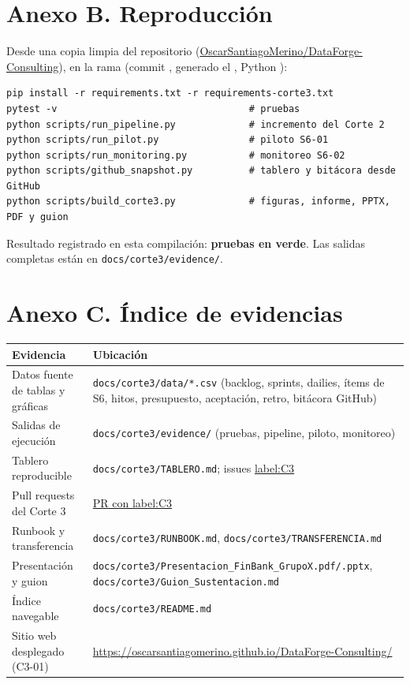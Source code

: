 \documentclass[10pt,a4paper]{article}
\newcommand{\repo}{\href{https://github.com/OscarSantiagoMerino/DataForge-Consulting}{OscarSantiagoMerino/DataForge-Consulting}}
\begin{document}
\section*{Anexo B. Reproducción}
Desde una copia limpia del repositorio (\repo), en la rama \texttt{\Rama} (commit \texttt{\SHA}, generado el \Generado, Python \PyVer):
\begin{verbatim}
pip install -r requirements.txt -r requirements-corte3.txt
pytest -v                                  # pruebas
python scripts/run_pipeline.py             # incremento del Corte 2
python scripts/run_pilot.py                # piloto S6-01
python scripts/run_monitoring.py           # monitoreo S6-02
python scripts/github_snapshot.py          # tablero y bitácora desde GitHub
python scripts/build_corte3.py             # figuras, informe, PPTX, PDF y guion
\end{verbatim}
Resultado registrado en esta compilación: \textbf{\Tests{} pruebas en verde}. Las salidas completas están en \texttt{docs/corte3/evidence/}.

\begin{table}[h]
\caption{Detalle del monitoreo semanal (\texttt{monitoring\_report.csv})}

\end{table}

\section*{Anexo C. Índice de evidencias}
\small
\begin{tabularx}{\linewidth}{l X}
\toprule
\textbf{Evidencia} & \textbf{Ubicación} \\
\midrule
Datos fuente de tablas y gráficas & \texttt{docs/corte3/data/*.csv} (backlog, sprints, dailies, ítems de S6, hitos, presupuesto, aceptación, retro, bitácora GitHub) \\
Salidas de ejecución & \texttt{docs/corte3/evidence/} (pruebas, pipeline, piloto, monitoreo) \\
Tablero reproducible & \texttt{docs/corte3/TABLERO.md}; issues \href{https://github.com/OscarSantiagoMerino/DataForge-Consulting/issues?q=label\%3AC3}{label:C3} \\
Pull requests del Corte 3 & \href{https://github.com/OscarSantiagoMerino/DataForge-Consulting/pulls?q=label\%3AC3}{PR con label:C3} \\
Runbook y transferencia & \texttt{docs/corte3/RUNBOOK.md}, \texttt{docs/corte3/TRANSFERENCIA.md} \\
Presentación y guion & \texttt{docs/corte3/Presentacion\_FinBank\_GrupoX.pdf/.pptx}, \texttt{docs/corte3/Guion\_Sustentacion.md} \\
Índice navegable & \texttt{docs/corte3/README.md} \\
Sitio web desplegado (C3-01) & \url{https://oscarsantiagomerino.github.io/DataForge-Consulting/} \\
\bottomrule
\end{tabularx}
\end{document}
